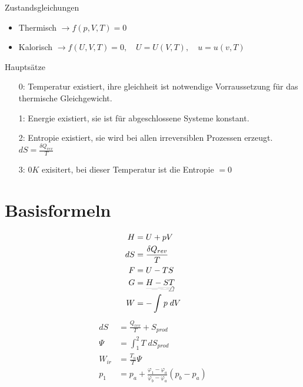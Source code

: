 \documentclass[twocolumn]{article}
\begin{document}
Zustandsgleichungen
\begin{itemize}
	\item Thermisch $\rightarrow f(p, V, T) = 0$ 
	\item Kalorisch $\rightarrow f(U, V, T) = 0, \quad  U = U(V,T), \quad u = u(v,T)$ 
\end{itemize}

Hauptsätze
\begin{itemize}
	\item[0:] Temperatur existiert, ihre gleichheit ist notwendige Vorraussetzung für das thermische Gleichgewicht. 
	\item[1:] Energie existiert, sie ist für abgeschlossene Systeme konstant.  
	\item[2:] Entropie existiert, sie wird bei allen irreversiblen Prozessen erzeugt. $dS = \frac{\delta Q_{rev}}{T}$
	\item[3:] $0K$ exisitert, bei dieser Temperatur ist die Entropie $= 0$ 
\end{itemize}

%                                                                

\section{Basisformeln}

\begin{multicols}{2}
\begin{align*}
	H 	&=	U + pV 				\\ 	
       	dS 	&=	\frac{\delta Q_{rev}}{T}	\\
	F 	&=	U-TS 				\\
	G 	&=	\underrightswishingghost{H-ST}	\\
	W 	&=	-\int_{}^{} p\; dV		\\
	\end{align*}
	\begin{align*}
       	dS 	&=  	\frac{Q_{rev}}{T} + S_{prod}	\\
	\Psi 	&= 	\int_{1}^{2} T\; dS_{prod}	\\
	W_{ir}	&=	\frac{T_u}{T}\Psi		\\
	p_1 	&= p_a  + \frac{\varphi_1 - \varphi_a}{\varphi_b- \varphi_a}(p_b - p_a) \\
\end{align*}
\end{multicols}
\end{document}
